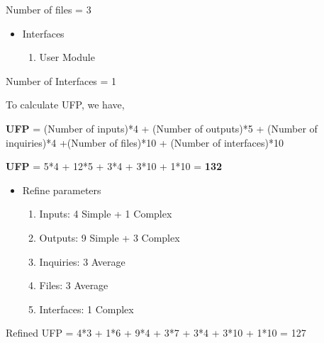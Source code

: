 \documentclass[12pt]{report}
\begin{document}
Number of files = 3

\begin{itemize}
    \item Interfaces
    \begin{enumerate}
        \item User Module
    \end{enumerate}
\end{itemize}
Number of Interfaces = 1

To calculate UFP, we have,
\vspace{3pt}

\textbf{UFP} =  (Number of inputs)*4 + (Number of outputs)*5 + (Number of inquiries)*4 +(Number of files)*10 + (Number of interfaces)*10

\textbf{UFP} = 5*4 + 12*5 + 3*4 + 3*10 + 1*10 = \textbf{132}

\begin{itemize}
    \item Refine parameters
    \begin{enumerate}
        \item Inputs: 4 Simple + 1 Complex
        \item Outputs: 9 Simple + 3 Complex
        \item Inquiries: 3 Average
        \item Files: 3 Average
        \item Interfaces: 1 Complex
    \end{enumerate}
\end{itemize}

Refined UFP = 4*3 + 1*6 + 9*4 + 3*7 + 3*4 + 3*10 + 1*10 = 127
\end{document}
